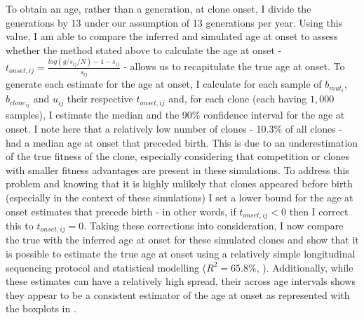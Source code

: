 \begin{figure}[h]
	\label{fig:explained-traj-sim}
\end{figure}

To obtain an age, rather than a generation, at clone onset, I divide the generations by 13 under our assumption of 13 generations per year. Using this value, I am able to compare the inferred and simulated age at onset to assess whether the method stated above to calculate the age at onset - $t_{onset,ij} = \frac{log(g/s_{ij}/N)-1-s_{ij}}{s_{ij}}$ - allows us to recapitulate the true age at onset. To generate each estimate for the age at onset, I calculate for each sample of $b_{mut_i}$, $b_{clone_{ij}}$ and $u_{ij}$ their respective $t_{onset,ij}$ and, for each clone (each having $1,000$ samples), I estimate the median and the 90\% confidence interval for the age at onset. I note here that a relatively low number of clones - 10.3\% of all clones - had a median age at onset that preceded birth. This is due to an underestimation of the true fitness of the clone, especially considering that competition or clones with smaller fitness advantages are present in these simulations. To address this problem and knowing that it is highly unlikely that clones appeared before birth (especially in the context of these simulations) I set a lower bound for the age at onset estimates that precede birth - in other words, if $t_{onset,ij} < 0$ then I correct this to $t_{onset,ij}=0$. Taking these corrections into consideration, I now compare the true with the inferred age at onset for these simulated clones and show that it is possible to estimate the true age at onset using a relatively simple longitudinal sequencing protocol and statistical modelling ($R^2 = 65.8\%$, ). Additionally, while these estimates can have a relatively high spread, their across age intervals shows they appear to be a consistent estimator of the age at onset as represented with the boxplots in . 

\begin{figure}[h]
	\label{fig:age-at-onset-sim}
\end{figure}

